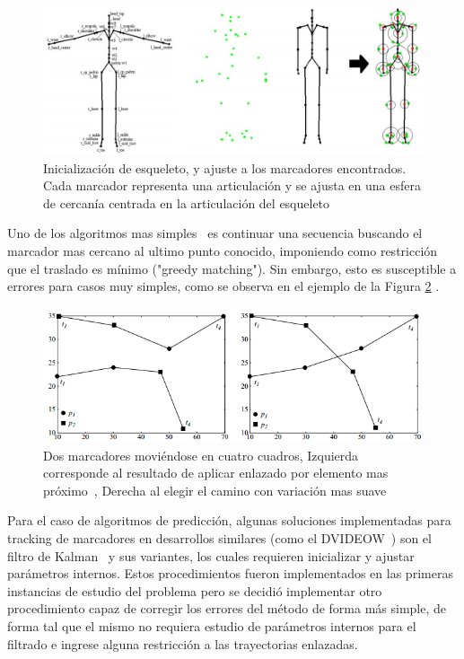 \begin{figure}[H]
\begin{center}
\includegraphics[scale=0.6]{img/Tracking/01_skeleton_fitting_Herda.png}
\end{center}
\caption{Inicialización de esqueleto, y ajuste a los marcadores encontrados. Cada marcador representa una articulación y se ajusta en una esfera de cercanía centrada en la articulación del esqueleto}
\label{skeleton_fitting_herda}
\end{figure}

Uno de los algoritmos mas simples~\cite{survey_tracking} es continuar una secuencia buscando el marcador mas cercano al ultimo punto conocido, imponiendo como restricción que el traslado es mínimo ("greedy matching"). Sin embargo, esto es susceptible a errores para casos muy simples, como se observa en el ejemplo de la Figura \ref{greedy_matching} .

\begin{figure}[hbt]
\begin{center}
\includegraphics[scale=0.8]{img/Tracking/01_Greedy_Matching.png}
\end{center}
\caption{Dos marcadores moviéndose en cuatro cuadros, Izquierda corresponde al resultado de aplicar enlazado por elemento mas próximo~\cite{survey_tracking}, Derecha al elegir el camino con variación mas suave}
\label{greedy_matching}
\end{figure}

Para el caso de algoritmos de predicción, algunas soluciones implementadas para tracking de marcadores en desarrollos similares (como el DVIDEOW~\cite{figueroa2003flexible}) son el filtro de Kalman~\cite{kalman} y sus variantes, los cuales requieren inicializar y ajustar parámetros internos. Estos procedimientos fueron implementados en las primeras instancias de estudio del problema pero se decidió implementar otro procedimiento capaz de corregir los errores del método de forma más simple, de forma tal que el mismo no requiera estudio de parámetros internos para el filtrado e ingrese alguna restricción a las trayectorias enlazadas.
\\ 

